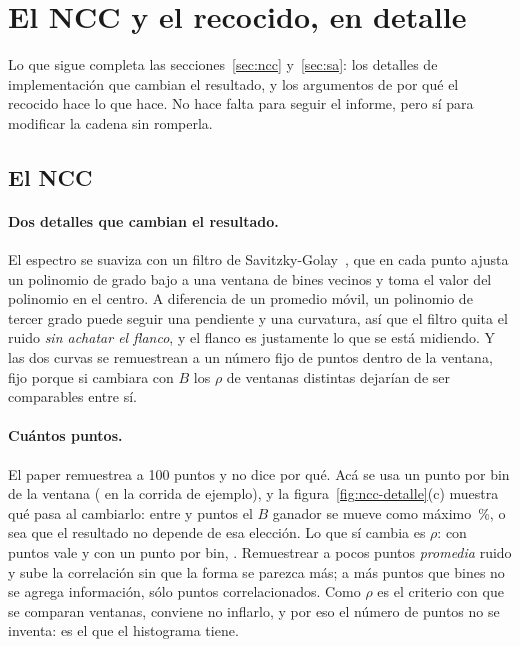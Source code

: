 \documentclass[11pt,a4paper]{article}
\begin{document}



\appendix
\section{El NCC y el recocido, en detalle}
\label{ap:ncc-sa}

Lo que sigue completa las secciones~\ref{sec:ncc} y~\ref{sec:sa}: los
detalles de implementación que cambian el resultado, y los argumentos de por
qué el recocido hace lo que hace. No hace falta para seguir el informe, pero
sí para modificar la cadena sin romperla.

\subsection{El NCC}

\paragraph{Dos detalles que cambian el resultado.} El espectro se suaviza con
un filtro de Savitzky-Golay~\cite{savitzky1964}, que en cada punto ajusta un
polinomio de grado bajo a una ventana de bines vecinos y toma el valor del
polinomio en el centro. A diferencia de un promedio móvil, un polinomio de
tercer grado puede seguir una pendiente y una curvatura, así que el filtro
quita el ruido \emph{sin achatar el flanco}, y el flanco es justamente lo que
se está midiendo. Y las dos curvas se remuestrean a un número fijo de puntos
dentro de la ventana, fijo porque si cambiara con $B$ los $\rho$ de ventanas
distintas dejarían de ser comparables entre sí.

\paragraph{Cuántos puntos.} El paper remuestrea a 100 puntos y no dice por
qué. Acá se usa un punto por bin de la ventana (\EjNptsAuto{} en la corrida de
ejemplo), y la figura~\ref{fig:ncc-detalle}(c) muestra qué pasa al cambiarlo:
entre \NptsMin{} y \NptsMax{} puntos el $B$ ganador se mueve como máximo
\NptsBDesvMax\,\%, o sea que el resultado no depende de esa elección. Lo que
sí cambia es $\rho$: con \NptsMin{} puntos vale \NptsRhoPocos{} y con un punto
por bin, \NptsRhoAuto. Remuestrear a pocos puntos \emph{promedia} ruido y
sube la correlación sin que la forma se parezca más; a más puntos que bines
no se agrega información, sólo puntos correlacionados. Como $\rho$ es el
criterio con que se comparan ventanas, conviene no inflarlo, y por eso el
número de puntos no se inventa: es el que el histograma tiene.
\end{document}
